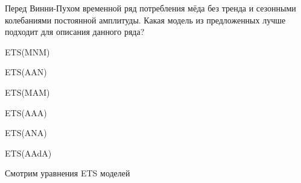 
\begin{question}
Перед Винни-Пухом временной ряд потребления мёда без тренда и сезонными колебаниями постоянной амплитуды.
Какая модель из предложенных лучше подходит для описания данного ряда?
\begin{answerlist}
  \item ETS(MNM)
  \item ETS(AAN)
  \item ETS(MAM)
  \item ETS(AAA)
  \item ETS(ANA)
  \item ETS(AAdA)
\end{answerlist}
\end{question}

\begin{solution}
Смотрим уравнения ETS моделей
\end{solution}

